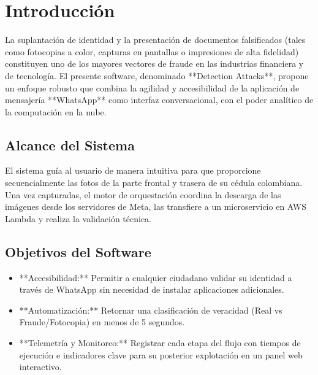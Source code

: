 \section{Introducción}
\label{sec:intro}

La suplantación de identidad y la presentación de documentos falsificados (tales como fotocopias a color, capturas en pantallas o impresiones de alta fidelidad) constituyen uno de los mayores vectores de fraude en las industrias financiera y de tecnología. El presente software, denominado **Detection Attacks**, propone un enfoque robusto que combina la agilidad y accesibilidad de la aplicación de mensajería **WhatsApp** como interfaz conversacional, con el poder analítico de la computación en la nube.

\subsection{Alcance del Sistema}
El sistema guía al usuario de manera intuitiva para que proporcione secuencialmente las fotos de la parte frontal y trasera de su cédula colombiana. Una vez capturadas, el motor de orquestación coordina la descarga de las imágenes desde los servidores de Meta, las transfiere a un microservicio en AWS Lambda y realiza la validación técnica. 

\subsection{Objetivos del Software}
\begin{itemize}
    \item **Accesibilidad:** Permitir a cualquier ciudadano validar su identidad a través de WhatsApp sin necesidad de instalar aplicaciones adicionales.
    \item **Automatización:** Retornar una clasificación de veracidad (Real vs Fraude/Fotocopia) en menos de 5 segundos.
    \item **Telemetría y Monitoreo:** Registrar cada etapa del flujo con tiempos de ejecución e indicadores clave para su posterior explotación en un panel web interactivo.
\end{itemize}

